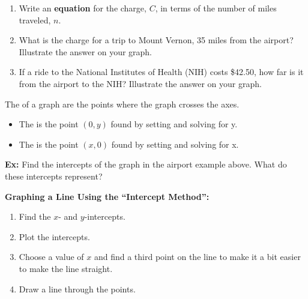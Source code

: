 \documentclass[12pt]{article}
\begin{document}
\begin{enumerate}
\item Write an \textbf{equation} for the charge, $C$, in terms of the number of miles traveled, $n$.


\vspace{1in}

\item What is the charge for a trip to Mount Vernon, 35 miles from the airport? Illustrate the answer on your graph.


\vspace{1in}




\item If a ride to the National Institutes of Health (NIH) costs \$42.50, how far is it from the airport to the NIH? Illustrate the answer on your graph.


\vspace{1.2in}
\end{enumerate}

\noindent The \underline{\hspace{1.2in}} of a graph are the points where the graph crosses the axes.\\

\begin{itemize}
\item The  \underline{\hspace{1.2in}} is the point $(0,y)$ found by setting   \underline{\hspace{1in}} and solving for y.\\
\item The  \underline{\hspace{1.2in}} is the point $(x,0)$ found by setting  \underline{\hspace{1in}} and solving for x.
\end{itemize}

\vspace{.3in}
\noindent \textbf{Ex:} Find the intercepts of the graph in the airport example above. What do these intercepts represent?

\vspace{2.2in}
\noindent \hrulefill

\noindent \textbf{Graphing a Line Using the ``Intercept Method'':}
\begin{enumerate}
\item Find the $x$- and $y$-intercepts.
\item Plot the intercepts.
\item Choose a value of $x$ and find a third point on the line to make it a bit easier to make the line straight.
\item Draw a line through the points.
\end{enumerate}
\noindent \hrulefill
\end{document}
